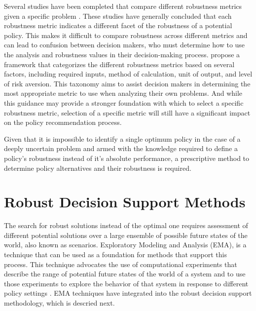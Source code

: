 Several studies have been completed that compare different robustness metrics given a specific problem \citep{Giuliani2016, Herman2015, Kwakkel2016Robust, Roach2016}. These studies have generally concluded that each robustness metric indicates a different facet of the robustness of a potential policy. This makes it difficult to compare robustness across different metrics and can lead to confusion between decision makers, who must determine how to use the analysis and robustness values in their decision-making process. \citet{McPhail2018} propose a framework that categorizes the different robustness metrics based on several factors, including required inputs, method of calculation, unit of output, and level of risk aversion. This taxonomy aims to assist decision makers in determining the most appropriate metric to use when analyzing their own problems. And while this guidance may provide a stronger foundation with which to select a specific robustness metric, selection of a specific metric will still have a significant impact on the policy recommendation process. 

Given that it is impossible to identify a single optimum policy in the case of a deeply uncertain problem and armed with the knowledge required to define a policy's robustness instead of it's  absolute performance, a prescriptive method to determine policy alternatives and their robustness is required.

\section{Robust Decision Support Methods}\label{review-methods}
The search for robust solutions instead of the optimal one requires assessment of  different potential solutions over a large ensemble of possible future states of the world, also known as scenarios. Exploratory Modeling and Analysis (EMA), is a technique that can be used as a foundation for methods that support this process. This technique advocates the use of computational experiments that describe the range of potential future states of the world of a system and to use those experiments to explore the behavior of that system in response to different policy settings \citep{Bankes1993}. EMA techniques have integrated into the robust decision support methodology, which is descried next. 

